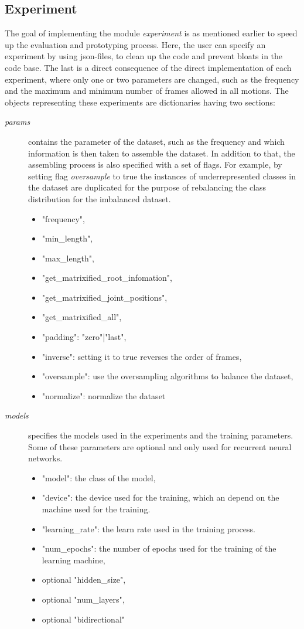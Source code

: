 		\subsection{Experiment}
			The goal of implementing the module \textit{experiment} is as mentioned earlier to speed up the evaluation and prototyping process. Here, the user can specify an experiment by using json-files, to clean up the code and prevent bloats in the code base. The last is a direct consequence of the direct implementation of each experiment, where only one or two parameters are changed, such as the frequency and the maximum and minimum number of frames allowed in all motions. The objects representing these experiments are dictionaries having two sections:
			\begin{description}
				\item[\textit{params}] contains the parameter of the dataset, such as the frequency and which information is then taken to assemble the dataset. In addition to that, the assembling process is also specified with a set of flags. For example, by setting flag \textit{oversample} to true the instances of underrepresented classes in the dataset are duplicated for the purpose of rebalancing the class distribution for the imbalanced dataset. 
					\begin{itemize}
						\item "frequency",
						\item "min\_length",
						\item "max\_length",
						\item "get\_matrixified\_root\_infomation",
						\item "get\_matrixified\_joint\_positions",
						\item "get\_matrixified\_all",
						\item "padding": "zero"|"last",
						\item "inverse": setting it to true reverses the order of frames,
						\item "oversample": use the oversampling algorithms to balance the dataset,
						\item "normalize": normalize the dataset
					\end{itemize}
				\item[\textit{models}] specifies the models used in the experiments and the training parameters. Some of these parameters are optional and only used for recurrent neural networks.
					\begin{itemize}
						\item "model": the class of the model,
						\item "device": the device used for the training, which an depend on the machine used for the training.
						\item "learning\_rate": the learn rate used in the training process.
						\item "num\_epochs": the number of epochs used for the training of the learning machine,
						\item optional "hidden\_size",
						\item optional "num\_layers",
						\item optional "bidirectional"
					\end{itemize}
			\end{description}
